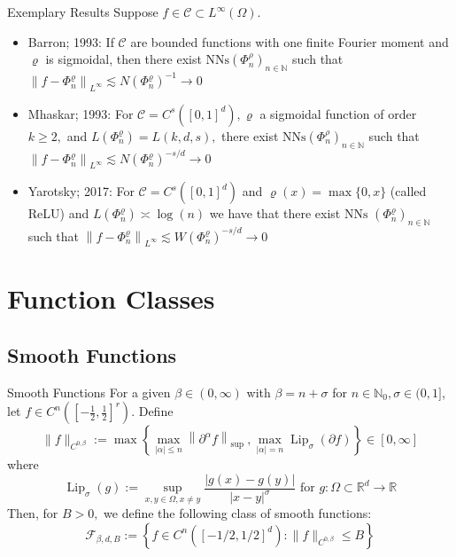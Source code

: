 \documentclass{if-beamer}
\begin{document}
\begin{frame}{Exemplary Results}
    Suppose $f \in \mathcal{C} \subset L^{\infty}(\Omega)$.
    \begin{itemize}
        \item Barron; 1993: If $\mathcal{C}$ are bounded functions with one finite Fourier moment and $\varrho$ is sigmoidal, then there exist $\mathrm{NNs}\left(\Phi_{n}^{\rho}\right)_{n \in \mathbb{N}}$ such that $\left\|f-\Phi_{n}^{\varrho}\right\|_{L^{\infty}} \lesssim N\left(\Phi_{n}^{\varrho}\right)^{-1} \rightarrow 0$
        \item Mhaskar; 1993: For $\mathcal{C}=C^{s}\left([0,1]^{d}\right), \varrho$ a sigmoidal function of order $k \geq 2,$ and $L\left(\Phi_{n}^{\varrho}\right)=L(k, d, s),$ there exist $\mathrm{NNs}\left(\Phi_{n}^{\rho}\right)_{n \in \mathbb{N}}$ such that $\left\|f-\Phi_{n}^{\varrho}\right\|_{L^{\infty}} \lesssim N\left(\Phi_{n}^{\varrho}\right)^{-s / d} \rightarrow 0$
        \item Yarotsky; 2017: For $\mathcal{C}=C^{s}\left([0,1]^{d}\right)$ and $\varrho(x)=\max \{0, x\}$
        (called ReLU) and $L\left(\Phi_{n}^{\varrho}\right) \asymp \log (n)$ we have that there exist $\mathrm{NNs}$
        $\left(\Phi_{n}^{\varrho}\right)_{n \in \mathbb{N}}$ such that $\left\|f-\Phi_{n}^{\varrho}\right\|_{L^{\infty}} \lesssim W\left(\Phi_{n}^{\varrho}\right)^{-s / d} \rightarrow 0$
    \end{itemize}
\end{frame}

\section{Function Classes}
\subsection{Smooth Functions}
\begin{frame}{Smooth Functions}
    For a given $\beta \in (0,\infty)$ with $\beta = n + \sigma$ for $n \in \mathbb{N}_0, \sigma \in (0,1]$, let $f \in C^n([-\frac{1}{2}, \frac{1}{2}]^r)$. Define $$\|f\|_{C^{0, \beta}}:=\max \left\{\max _{|\alpha| \leq n}\left\|\partial^{\alpha} f\right\|_{\text {sup }}, \max _{|\alpha|=n} \operatorname{Lip}_{\sigma}(\partial f)\right\} \in[0, \infty] $$
    where \[
    \operatorname{Lip}_{\sigma}(g):=\sup _{x, y \in \Omega, x \neq y} \frac{|g(x)-g(y)|}{|x-y|^{\sigma}} \text { for } g: \Omega \subset \mathbb{R}^{d} \rightarrow \mathbb{R}
    \]
    Then, for $B>0,$ we define the following class of smooth functions:
    \[
    \mathcal{F}_{\beta, d, B}:=\left\{f \in C^{n}\left([-1 / 2,1 / 2]^{d}\right):\|f\|_{C^{0, \beta}} \leq B\right\}
    \]
\end{frame}
\end{document}
